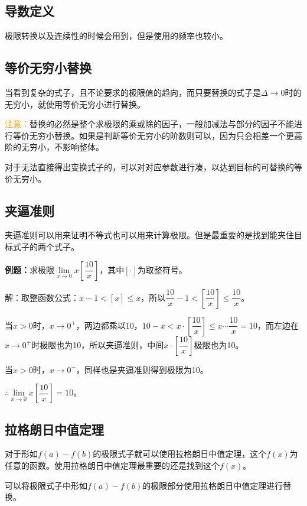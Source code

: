 \documentclass[UTF8, 12pt]{ctexart}
\begin{document}
\subsection{导数定义}

极限转换以及连续性的时候会用到，但是使用的频率也较小。

\subsection{等价无穷小替换}

当看到复杂的式子，且不论要求的极限值的趋向，而只要替换的式子是$\Delta\to 0$时的无穷小，就使用等价无穷小进行替换。

\textcolor{orange}{注意：}替换的必然是整个求极限的乘或除的因子，一般加减法与部分的因子不能进行等价无穷小替换。如果是判断等价无穷小的阶数则可以，因为只会相差一个更高阶的无穷小，不影响整体。

对于无法直接得出变换式子的，可以对对应参数进行凑，以达到目标的可替换的等价无穷小。

\subsection{夹逼准则}

夹逼准则可以用来证明不等式也可以用来计算极限。但是最重要的是找到能夹住目标式子的两个式子。\medskip

\textbf{例题：}求极限$\lim\limits_{x\to 0}x\left[\dfrac{10}{x}\right]$，其中$[\cdot]$为取整符号。

解：取整函数公式：$x-1<[x]\leqslant x$，所以$\dfrac{10}{x}-1<\left[\dfrac{10}{x}\right]\leqslant\dfrac{10}{x}$。

当$x>0$时，$x\to 0^+$，两边都乘以10，$10-x<x\cdot\left[\dfrac{10}{x}\right]\leqslant x\cdots\dfrac{10}{x}=10$，而左边在$x\to 0^+$时极限也为10，所以夹逼准则，中间$x\cdot\left[\dfrac{10}{x}\right]$极限也为10。\medskip

当$x>0$时，$x\to 0^-$，同样也是夹逼准则得到极限为10。\medskip

$\therefore \lim\limits_{x\to 0}x\left[\dfrac{10}{x}\right]=10$。

\subsection{拉格朗日中值定理}

对于形如$f(a)-f(b)$的极限式子就可以使用拉格朗日中值定理，这个$f(x)$为任意的函数。使用拉格朗日中值定理最重要的还是找到这个$f(x)$。

可以将极限式子中形如$f(a)-f(b)$的极限部分使用拉格朗日中值定理进行替换。
\end{document}
